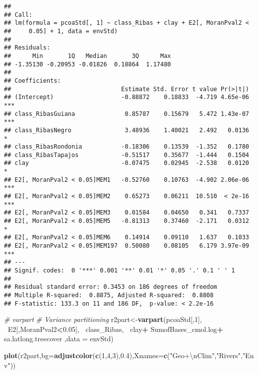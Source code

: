 \documentclass[]{article}
\newenvironment{Shaded}{\begin{snugshade}}{\end{snugshade}}
\newcommand{\CharTok}[1]{\textcolor[rgb]{0.31,0.60,0.02}{#1}}
\newcommand{\CommentTok}[1]{\textcolor[rgb]{0.56,0.35,0.01}{\textit{#1}}}
\newcommand{\DataTypeTok}[1]{\textcolor[rgb]{0.13,0.29,0.53}{#1}}
\newcommand{\DecValTok}[1]{\textcolor[rgb]{0.00,0.00,0.81}{#1}}
\newcommand{\FloatTok}[1]{\textcolor[rgb]{0.00,0.00,0.81}{#1}}
\newcommand{\KeywordTok}[1]{\textcolor[rgb]{0.13,0.29,0.53}{\textbf{#1}}}
\newcommand{\NormalTok}[1]{#1}
\newcommand{\OperatorTok}[1]{\textcolor[rgb]{0.81,0.36,0.00}{\textbf{#1}}}
\newcommand{\StringTok}[1]{\textcolor[rgb]{0.31,0.60,0.02}{#1}}
\begin{document}
\begin{verbatim}
## 
## Call:
## lm(formula = pcoaStd[, 1] ~ class_Ribas + clay + E2[, MoranPval2 < 
##     0.05] + 1, data = envStd)
## 
## Residuals:
##      Min       1Q   Median       3Q      Max 
## -1.35130 -0.20953 -0.01826  0.18864  1.17480 
## 
## Coefficients:
##                               Estimate Std. Error t value Pr(>|t|)    
## (Intercept)                   -0.88872    0.18833  -4.719 4.65e-06 ***
## class_RibasGuiana              0.85787    0.15679   5.472 1.43e-07 ***
## class_RibasNegro               3.48936    1.40021   2.492   0.0136 *  
## class_RibasRondonia           -0.18306    0.13539  -1.352   0.1780    
## class_RibasTapajos            -0.51517    0.35677  -1.444   0.1504    
## clay                          -0.07475    0.02945  -2.538   0.0120 *  
## E2[, MoranPval2 < 0.05]MEM1   -0.52760    0.10763  -4.902 2.06e-06 ***
## E2[, MoranPval2 < 0.05]MEM2    0.65273    0.06211  10.510  < 2e-16 ***
## E2[, MoranPval2 < 0.05]MEM3    0.01584    0.04650   0.341   0.7337    
## E2[, MoranPval2 < 0.05]MEM5   -0.81313    0.37460  -2.171   0.0312 *  
## E2[, MoranPval2 < 0.05]MEM6    0.14914    0.09110   1.637   0.1033    
## E2[, MoranPval2 < 0.05]MEM197  0.50080    0.08105   6.179 3.97e-09 ***
## ---
## Signif. codes:  0 '***' 0.001 '**' 0.01 '*' 0.05 '.' 0.1 ' ' 1
## 
## Residual standard error: 0.3453 on 186 degrees of freedom
## Multiple R-squared:  0.8875, Adjusted R-squared:  0.8808 
## F-statistic: 133.3 on 11 and 186 DF,  p-value: < 2.2e-16
\end{verbatim}

\begin{Shaded}
\begin{Highlighting}[]
\CommentTok{# varpart}
\CommentTok{# Variance partitioning}
\NormalTok{r2part<-}\KeywordTok{varpart}\NormalTok{(pcoaStd[,}\DecValTok{1}\NormalTok{],}
                \OperatorTok{~}\NormalTok{E2[,MoranPval2}\OperatorTok{<}\FloatTok{0.05}\NormalTok{],}
                \OperatorTok{~}\NormalTok{class_Ribas,}
                \OperatorTok{~}\NormalTok{clay}\OperatorTok{+}
\StringTok{                  }\NormalTok{SumofBases_cmol.log}\OperatorTok{+}
\StringTok{                  }\NormalTok{sa.latlong.treecover}
\NormalTok{                ,}\DataTypeTok{data =}\NormalTok{ envStd)}


\KeywordTok{plot}\NormalTok{(r2part,}\DataTypeTok{bg=}\KeywordTok{adjustcolor}\NormalTok{(}\KeywordTok{c}\NormalTok{(}\DecValTok{1}\NormalTok{,}\DecValTok{4}\NormalTok{,}\DecValTok{3}\NormalTok{),}\FloatTok{0.4}\NormalTok{),}\DataTypeTok{Xnames=}\KeywordTok{c}\NormalTok{(}\StringTok{"Geo+}\CharTok{\textbackslash{}n}\StringTok{Clim"}\NormalTok{,}\StringTok{"Rivers"}\NormalTok{,}\StringTok{"Env"}\NormalTok{))}
\end{Highlighting}
\end{Shaded}
\end{document}
